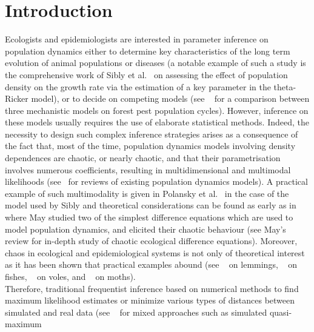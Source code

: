 \documentclass[12pt]{article}
\begin{document}
	\newpage
	
	{\hypersetup{hidelinks}
	\listoffigures
	}
	{\hypersetup{hidelinks}
	\listoftables
	}
	\clearpage
	{\hypersetup{hidelinks}
		\tableofcontents
	}
	
	\clearpage
	\section{Introduction}
	Ecologists and epidemiologists are interested in parameter inference on population dynamics either to determine key characteristics of the long term evolution of animal populations or diseases (a notable example of such a study is the comprehensive work of Sibly et al.~\cite{sibly2005regulation} on assessing the effect of population density on the growth rate via the estimation of a key parameter in the theta-Ricker model), or to decide on competing models (see ~\cite{kendall2005population} for a comparison between three mechanistic models on forest pest population cycles). However, inference on these models usually requires the use of elaborate statistical methods. Indeed, the necessity to design such complex inference strategies arises as a consequence of the fact that, most of the time, population dynamics models involving density dependences are chaotic, or nearly chaotic, and that their parametrisation involves numerous coefficients, resulting in multidimensional and multimodal likelihoods (see~\cite{hanski1990density, woiwod1992patterns, turchin2003complex, brook2006strength} for reviews of existing population dynamics models). A practical example of such multimodality is given in Polansky et al.~\cite{polansky2009likelihood} in the case of the model used by Sibly and theoretical considerations can be found as early as in \cite{may1975biological} where May studied two of the simplest difference equations which are used to model population dynamics, and elicited their chaotic behaviour (see May's~\cite{may1986search, may1989chaotic} review for in-depth study of chaotic ecological difference equations). Moreover, chaos in ecological and epidemiological systems is not only of theoretical interest as it has been shown that practical examples abound (see ~\cite{kausrud2008linking} on lemmings, ~\cite{anderson2008fishing} on fishes, ~\cite{turchin2000living} on voles, and ~\cite{kendall2005population} on moths). \\
	Therefore, traditional frequentist inference based on numerical methods to find maximum likelihood estimates or minimize various types of distances between simulated and real data (see ~\cite{kendall1999populations,kendall2005population} for mixed approaches such as simulated quasi-maximum
\end{document}
